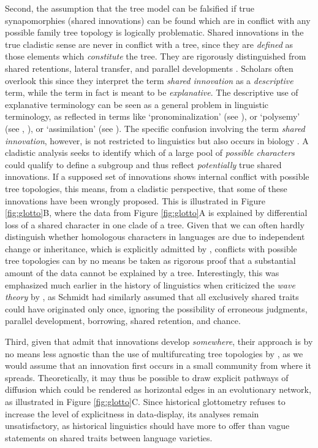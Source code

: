 \documentclass[svgnames,12pt]{scrartcl}
\begin{document}
{{Second, the assumption that the tree
model can be falsified if true synapomorphies (shared innovations) can be found which are in
conflict with any possible family tree topology is logically problematic.
Shared innovations in the true cladistic sense are
never in conflict with a tree, since they are \emph{defined} as those elements which
\emph{constitute} the
tree. They are rigorously distinguished from shared retentions, lateral transfer, and
parallel developments \citep{Fleischhauer2009}. Scholars often overlook this since they interpret
the term \emph{shared innovation} as a \emph{descriptive} term, while the term in fact is meant to
be \emph{explanative}. 
The descriptive use of explanative terminology can be seen as a general problem in
linguistic terminology, as reflected in terms like `{pronominalization}' (see
\citealt[2]{Jacques2016c}), or `{polysemy}' (see \citealt{Francois2008},
\citealt{List2013a}), or `{assimilation}' (see \citealt[32]{List2014d}). The specific confusion
involving the term \emph{shared innovation}, however, is not restricted
to linguistics but also occurs in biology \citep{DeLaet2005}.
A cladistic analysis seeks to identify which
of a large pool of \emph{possible characters} could qualify to define a subgroup and thus reflect
\emph{potentially} true shared innovations. If a supposed set of innovations shows internal conflict
with possible tree topologies, this means, from a cladistic perspective, that some of these
innovations have been wrongly proposed. This is illustrated in Figure \ref{fig:glotto}B, where the data from Figure
\ref{fig:glotto}A is explained by differential loss of a shared character in one clade of a tree. Given
that we can often hardly distinguish whether homologous characters in languages are due to independent
change or inheritance, which is explicitly admitted by \citet{Francois2014}, conflicts with possible tree topologies
can by no means be taken as rigorous proof that a substantial
amount of the data cannot
be explained by a tree.
Interestingly, this was emphasized much earlier in the history of linguistics
when \citet{Brugmann1884} criticized the \emph{wave
theory} by \citet{Schmidt1872}, as Schmidt had similarly assumed that all exclusively shared traits
could have originated only once, ignoring the possibility of erroneous judgments, parallel
development, borrowing, shared retention, and chance. 
 
Third, given that \citet{Kalyan2016} admit that innovations develop
\emph{somewhere}, their approach is by no means less agnostic than the use of multifurcating tree
topologies by \citet{Ross1988}, as we would assume that an innovation first occurs in a small
community from where it spreads. Theoretically, it may thus be possible to draw explicit pathways of
diffusion which could be rendered as horizontal edges in an evolutionary network, as illustrated in
Figure \ref{fig:glotto}C. Since historical glottometry refuses to increase the level of
explicitness in data-display, its analyses remain unsatisfactory, as historical linguistics should
have more to offer than vague statements on shared traits between language varieties. 

}}
\end{document}

